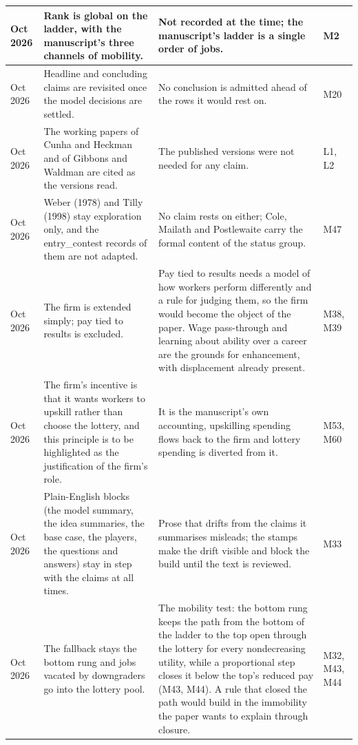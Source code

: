 \documentclass[10pt]{article}
\begin{document}
{\begin{longtable}{>{\raggedright\arraybackslash}p{2.0cm} >{\raggedright\arraybackslash}p{8.0cm} >{\raggedright\arraybackslash}p{10.0cm} >{\raggedright\arraybackslash}p{3.0cm}}
10 Oct 2026 & Rank is global on the ladder, with the manuscript's three channels of mobility. & Not recorded at the time; the manuscript's ladder is a single order of jobs. & M2 \\ \midrule
10 Oct 2026 & Headline and concluding claims are revisited once the model decisions are settled. & No conclusion is admitted ahead of the rows it would rest on. & M20 \\ \midrule
10 Oct 2026 & The working papers of Cunha and Heckman and of Gibbons and Waldman are cited as the versions read. & The published versions were not needed for any claim. & L1, L2 \\ \midrule
11 Oct 2026 & Weber (1978) and Tilly (1998) stay exploration only, and the entry\_contest records of them are not adapted. & No claim rests on either; Cole, Mailath and Postlewaite carry the formal content of the status group. & M47 \\ \midrule
13 Oct 2026 & The firm is extended simply; pay tied to results is excluded. & Pay tied to results needs a model of how workers perform differently and a rule for judging them, so the firm would become the object of the paper. Wage pass-through and learning about ability over a career are the grounds for enhancement, with displacement already present. & M38, M39 \\ \midrule
13 Oct 2026 & The firm's incentive is that it wants workers to upskill rather than choose the lottery, and this principle is to be highlighted as the justification of the firm's role. & It is the manuscript's own accounting, upskilling spending flows back to the firm and lottery spending is diverted from it. & M53, M60 \\ \midrule
13 Oct 2026 & Plain-English blocks (the model summary, the idea summaries, the base case, the players, the questions and answers) stay in step with the claims at all times. & Prose that drifts from the claims it summarises misleads; the stamps make the drift visible and block the build until the text is reviewed. & M33 \\ \midrule
15 Oct 2026 & The fallback stays the bottom rung and jobs vacated by downgraders go into the lottery pool. & The mobility test: the bottom rung keeps the path from the bottom of the ladder to the top open through the lottery for every nondecreasing utility, while a proportional step closes it below the top's reduced pay (M43, M44). A rule that closed the path would build in the immobility the paper wants to explain through closure. & M32, M43, M44 \\ \midrule

\end{longtable}}
\end{document}
